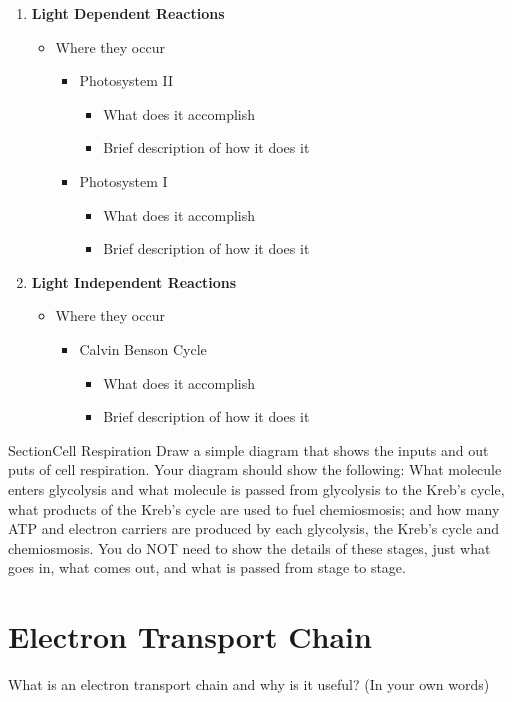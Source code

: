 \documentclass[a4paper]{article}
\begin{document}
\begin{enumerate} 
  \item \textbf{Light Dependent Reactions}
  \begin{itemize}
    \item Where they occur
    \begin{itemize}
      \item Photosystem II 
        \begin{itemize}
            \item What does it accomplish
            \item Brief description of how it does it 
        \end{itemize}
      \item Photosystem I 
        \begin{itemize}
            \item What does it accomplish
            \item Brief description of how it does it 
        \end{itemize}
    \end{itemize}
  \end{itemize}
    
  \item \textbf{Light Independent Reactions}
    \begin{itemize}
      \item Where they occur
        \begin{itemize}
          \item Calvin Benson Cycle
          \begin{itemize}
            \item What does it accomplish
            \item Brief description of how it does it 
          \end{itemize}
        \end{itemize}
    \end{itemize}
\end{enumerate}

\newpage

Section{Cell Respiration} 
Draw a simple diagram that shows the inputs and out puts of cell respiration. 
Your diagram should show the following: What molecule enters glycolysis and what molecule 
is passed from glycolysis to the Kreb’s cycle, what products of the Kreb’s cycle are used 
to fuel chemiosmosis; and how many ATP and electron carriers are produced by each glycolysis, 
the Kreb’s cycle and chemiosmosis. You do NOT need to show the details of these stages, 
just what goes in, what comes out, and what is passed from stage to stage. 
\newpage

\section{Electron Transport Chain}
What is an electron transport chain and why is it useful? (In your own words)
\end{document}
